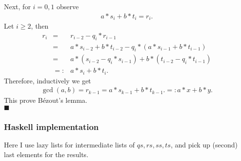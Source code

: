 \documentclass[11pt]{book}
\begin{document}
Next, for $i=0,1$ observe
\begin{eqnarray}
\label{guessOfRational}
a*s_i + b*t_i = r_i.
\end{eqnarray}
Let $i\geq 2$, then
\begin{eqnarray}
r_i &=& r_{i-2}  - q_i * r_{i-1} \\
&=& a*s_{i-2} + b*t_{i-2} - q_i *(a*s_{i-1} + b*t_{i-1} ) \\
&=& a*(s_{i-2} - q_i *s_{i-1}) + b* (t_{i-2} - q_i *t_{i-1} ) \\
&=:& a*s_i + b*t_i.
\end{eqnarray}
Therefore, inductively we get
\begin{eqnarray}
\gcd(a,b) = r_{k-1} = a*s_{k-1} + b*t_{k-1}. =: a*x + b*y.
\end{eqnarray}
This prove B\'ezout's lemma. \\
$\blacksquare$

\subsubsection{Haskell implementation}
\label{exGCDHaskell}
Here I use lazy lists for intermediate lists of $qs,rs,ss,ts$, and pick up (second) last elements for the results.
\end{document}
